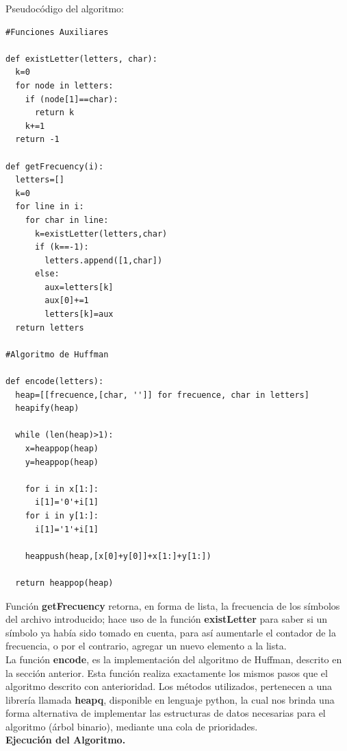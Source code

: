 \documentclass[12pt]{report}
\begin{document}
	Pseudocódigo del algoritmo:
	\lstset{language=python, breaklines=true, basicstyle=\footnotesize}
	\lstset{numbers=left, numberstyle=\tiny, stepnumber=1, numbersep=10pt}
	\begin{lstlisting}
#Funciones Auxiliares

def existLetter(letters, char):
  k=0
  for node in letters:
    if (node[1]==char):
      return k 
    k+=1
  return -1

def getFrecuency(i):
  letters=[]
  k=0
  for line in i:
    for char in line:
      k=existLetter(letters,char)
      if (k==-1):
        letters.append([1,char])
      else:
        aux=letters[k]
        aux[0]+=1
        letters[k]=aux
  return letters

#Algoritmo de Huffman

def encode(letters):
  heap=[[frecuence,[char, '']] for frecuence, char in letters]
  heapify(heap)

  while (len(heap)>1):
    x=heappop(heap)
    y=heappop(heap)

    for i in x[1:]:
      i[1]='0'+i[1]
    for i in y[1:]:
      i[1]='1'+i[1]

    heappush(heap,[x[0]+y[0]]+x[1:]+y[1:])

  return heappop(heap)

	\end{lstlisting}
	
	\newpage

Función \textbf{getFrecuency} retorna, en forma de lista, la frecuencia de los símbolos del archivo introducido; hace uso de la función \textbf{existLetter} para saber si un símbolo ya había sido tomado en cuenta, para así aumentarle el contador de la frecuencia, o por el contrario, agregar un nuevo elemento a la lista.\\
La función \textbf{encode}, es la implementación del algoritmo de Huffman, descrito en la sección anterior. Esta función realiza exactamente los mismos pasos que el algoritmo descrito con anterioridad. Los métodos utilizados, pertenecen a una librería llamada \textbf{heapq}, disponible en lenguaje python, la cual nos brinda una forma alternativa de implementar las estructuras de datos necesarias para el algoritmo (árbol binario), mediante una cola de prioridades.\\

\textbf{Ejecución del Algoritmo.}\\
	
\end{document}
